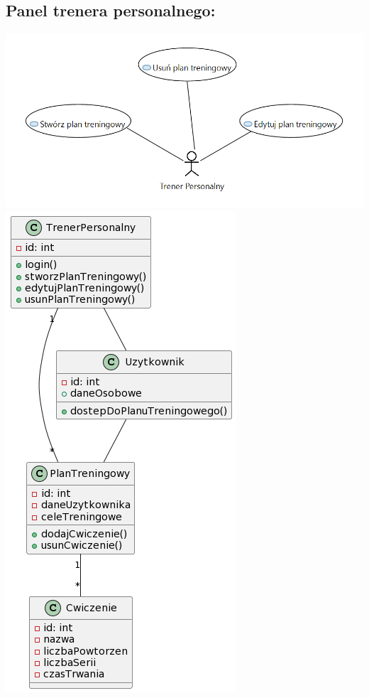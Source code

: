 \documentclass[
]{article}
\begin{document}
\hypertarget{h.9umzk2qmsz4g}{%
\subsection{\texorpdfstring{{Panel trenera
personalnego:}}{Panel trenera personalnego:}}\label{h.9umzk2qmsz4g}}

{\includegraphics{diagrams/use_cases/trener_personalny.png}}
{\includegraphics{diagrams/class/trener_personalny_klasy.png}}
\end{document}
